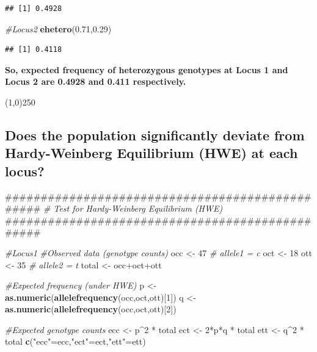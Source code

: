 \documentclass[]{article}
\newenvironment{Shaded}{\begin{snugshade}}{\end{snugshade}}
\newcommand{\KeywordTok}[1]{\textcolor[rgb]{0.13,0.29,0.53}{\textbf{{#1}}}}
\newcommand{\DecValTok}[1]{\textcolor[rgb]{0.00,0.00,0.81}{{#1}}}
\newcommand{\FloatTok}[1]{\textcolor[rgb]{0.00,0.00,0.81}{{#1}}}
\newcommand{\StringTok}[1]{\textcolor[rgb]{0.31,0.60,0.02}{{#1}}}
\newcommand{\CommentTok}[1]{\textcolor[rgb]{0.56,0.35,0.01}{\textit{{#1}}}}
\newcommand{\NormalTok}[1]{{#1}}
\begin{document}
\begin{verbatim}
## [1] 0.4928
\end{verbatim}

\begin{Shaded}
\begin{Highlighting}[]
\CommentTok{#Locus2}
\KeywordTok{ehetero}\NormalTok{(}\FloatTok{0.71}\NormalTok{,}\FloatTok{0.29}\NormalTok{)}
\end{Highlighting}
\end{Shaded}

\begin{verbatim}
## [1] 0.4118
\end{verbatim}

\textbf{So, expected frequency of heterozygous genotypes at Locus 1 and
Locus 2 are 0.4928 and 0.411 respectively.}

\begin{center}
\line(1,0){250}
\end{center}

\subsection{Does the population significantly deviate from
Hardy-Weinberg Equilibrium (HWE) at each
locus?}\label{does-the-population-significantly-deviate-from-hardy-weinberg-equilibrium-hwe-at-each-locus}

\begin{Shaded}
\begin{Highlighting}[]
\NormalTok{################################################}
\CommentTok{# Test for Hardy-Weinberg Equilibrium (HWE)}
\NormalTok{################################################}

\CommentTok{#Locus1}
\CommentTok{#Observed data (genotype counts)}
\NormalTok{occ <-}\StringTok{ }\DecValTok{47}     \CommentTok{# allele1 = c}
\NormalTok{oct <-}\StringTok{ }\DecValTok{18}
\NormalTok{ott <-}\StringTok{ }\DecValTok{35}     \CommentTok{# allele2 = t}
\NormalTok{total <-}\StringTok{ }\NormalTok{occ+oct+ott}

\CommentTok{#Expected frequency (under HWE)}
\NormalTok{p <-}\StringTok{ }\KeywordTok{as.numeric}\NormalTok{(}\KeywordTok{allelefrequency}\NormalTok{(occ,oct,ott)[}\DecValTok{1}\NormalTok{])}
\NormalTok{q <-}\StringTok{ }\KeywordTok{as.numeric}\NormalTok{(}\KeywordTok{allelefrequency}\NormalTok{(occ,oct,ott)[}\DecValTok{2}\NormalTok{])}

\CommentTok{#Expected genotype counts}
\NormalTok{ecc <-}\StringTok{ }\NormalTok{p^}\DecValTok{2} \NormalTok{*}\StringTok{ }\NormalTok{total}
\NormalTok{ect <-}\StringTok{ }\DecValTok{2}\NormalTok{*p*q *}\StringTok{ }\NormalTok{total}
\NormalTok{ett <-}\StringTok{ }\NormalTok{q^}\DecValTok{2} \NormalTok{*}\StringTok{ }\NormalTok{total}
\KeywordTok{c}\NormalTok{(}\StringTok{"ecc"}\NormalTok{=ecc,}\StringTok{"ect"}\NormalTok{=ect,}\StringTok{"ett"}\NormalTok{=ett)}
\end{Highlighting}
\end{Shaded}
\end{document}
